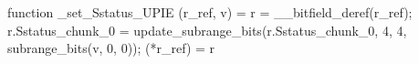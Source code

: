 function _set_Sstatus_UPIE (r_ref, v) = {
    r = __bitfield_deref(r_ref);
    r.Sstatus_chunk_0 = update_subrange_bits(r.Sstatus_chunk_0, 4, 4, subrange_bits(v, 0, 0));
    (*r_ref) = r
}
